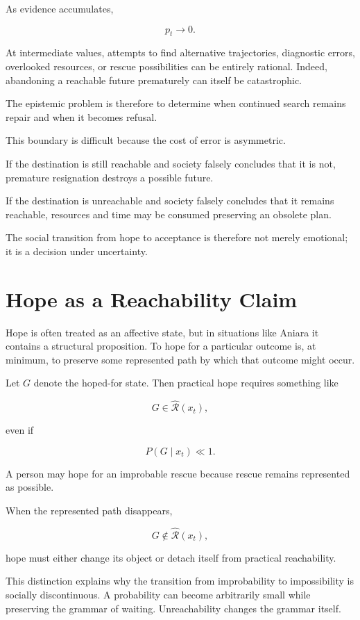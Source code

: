 \documentclass[11pt,oneside]{book}
\theoremstyle{definition}
\theoremstyle{remark}
\newcommand{\R}{\mathcal{R}}
\begin{document}
As evidence accumulates,

\[
p_t\rightarrow0.
\]

At intermediate values, attempts to find alternative trajectories, diagnostic errors, overlooked resources, or rescue possibilities can be entirely rational. Indeed, abandoning a reachable future prematurely can itself be catastrophic.

The epistemic problem is therefore to determine when continued search remains repair and when it becomes refusal.

This boundary is difficult because the cost of error is asymmetric.

If the destination is still reachable and society falsely concludes that it is not, premature resignation destroys a possible future.

If the destination is unreachable and society falsely concludes that it remains reachable, resources and time may be consumed preserving an obsolete plan.

The social transition from hope to acceptance is therefore not merely emotional; it is a decision under uncertainty.

\section{Hope as a Reachability Claim}

Hope is often treated as an affective state, but in situations like Aniara it contains a structural proposition. To hope for a particular outcome is, at minimum, to preserve some represented path by which that outcome might occur.

Let \(G\) denote the hoped-for state. Then practical hope requires something like

\[
G\in\widehat{\R}(x_t),
\]

even if

\[
P(G\mid x_t)\ll1.
\]

A person may hope for an improbable rescue because rescue remains represented as possible.

When the represented path disappears,

\[
G\notin\widehat{\R}(x_t),
\]

hope must either change its object or detach itself from practical reachability.

This distinction explains why the transition from improbability to impossibility is socially discontinuous. A probability can become arbitrarily small while preserving the grammar of waiting. Unreachability changes the grammar itself.
\end{document}
